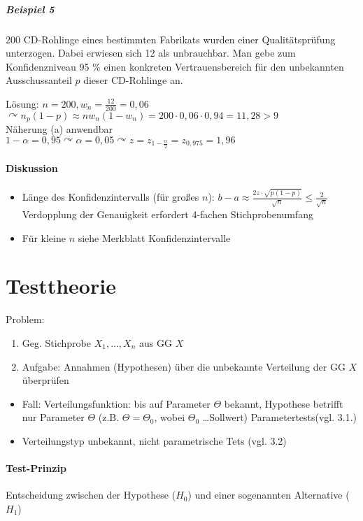 \documentclass[a4paper]{scrartcl}
\begin{document}
\subparagraph{Beispiel 5} 200 CD-Rohlinge eines bestimmten Fabrikats wurden einer Qualitätsprüfung unterzogen. Dabei erwiesen sich 12 als unbrauchbar. Man gebe zum Konfidenzniveau 95 \% einen konkreten Vertrauensbereich für den unbekannten Ausschussanteil $p$ dieser CD-Rohlinge an.

Lösung: $n=200, w_n = \frac{12}{200} = 0,06$\\
$ \curvearrowright n_p (1-p) \approx nw_n (1-w_n) = 200 \cdot 0,06 \cdot 0,94 = 11,28 >9$\\
Näherung (a) anwendbar\\
$1-\alpha = 0,95 \curvearrowright  \alpha = 0,05 \curvearrowright z = z_{1-\frac{\alpha}{2}} = z_{0,975} = 1,96$

\paragraph{Diskussion}
\begin{itemize}
\item Länge des Konfidenzintervalls (für großes $n$): $b-a \approx \frac{2z \cdot \sqrt{p(1-p)}}{\sqrt{n}} \leq \frac{2}{\sqrt{n}}$ Verdopplung der Genauigkeit erfordert 4-fachen Stichprobenumfang
\item Für kleine $n$ siehe Merkblatt Konfidenzintervalle
\end{itemize}

\section{Testtheorie}
Problem:
\begin{enumerate}
\item Geg. Stichprobe $X_1,\dots,X_n$ aus GG $X$
\item Aufgabe: Annahmen (Hypothesen) über die unbekannte Verteilung der GG $X$ überprüfen
\end{enumerate}
\begin{itemize}
\item Fall: Verteilungsfunktion: bis auf Parameter $\Theta$ bekannt, Hypothese betrifft nur Parameter $\Theta$ (z.B. $\Theta = \Theta_0$, wobei $\Theta_0$ \dots Sollwert) Parametertests(vgl. 3.1.)
\item Verteilungstyp unbekannt, nicht parametrische Tets (vgl. 3.2)
\end{itemize}

\paragraph{Test-Prinzip} Entscheidung zwischen der Hypothese ($H_0$) und einer sogenannten Alternative ($H_1$)
\end{document}

